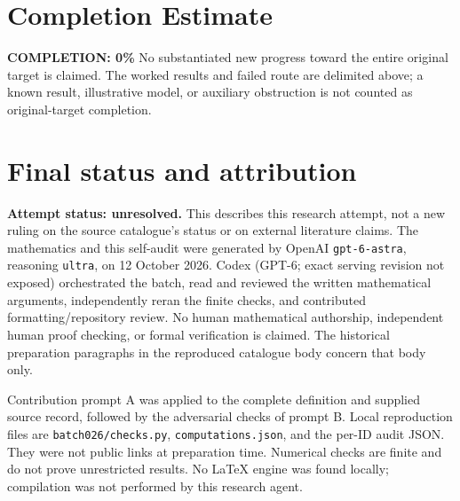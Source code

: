 \documentclass[11pt]{article}
\begin{document}
\section{Completion Estimate}
\noindent\textbf{COMPLETION: 0\%}
No substantiated new progress toward the entire original target is claimed. The worked results and failed route are delimited above; a known result, illustrative model, or auxiliary obstruction is not counted as original-target completion.

\section{Final status and attribution}
\textbf{Attempt status: unresolved.} This describes this research attempt, not a new ruling on the source catalogue's status or on external literature claims.
The mathematics and this self-audit were generated by OpenAI \texttt{gpt-6-astra}, reasoning \texttt{ultra}, on 12 October 2026. Codex (GPT-6; exact serving revision not exposed) orchestrated the batch, read and reviewed the written mathematical arguments, independently reran the finite checks, and contributed formatting/repository review. No human mathematical authorship, independent human proof checking, or formal verification is claimed. The historical preparation paragraphs in the reproduced catalogue body concern that body only.

Contribution prompt A was applied to the complete definition and supplied source record, followed by the adversarial checks of prompt B. Local reproduction files are \texttt{batch026/checks.py}, \texttt{computations.json}, and the per-ID audit JSON. They were not public links at preparation time. Numerical checks are finite and do not prove unrestricted results. No LaTeX engine was found locally; compilation was not performed by this research agent.
\end{document}
